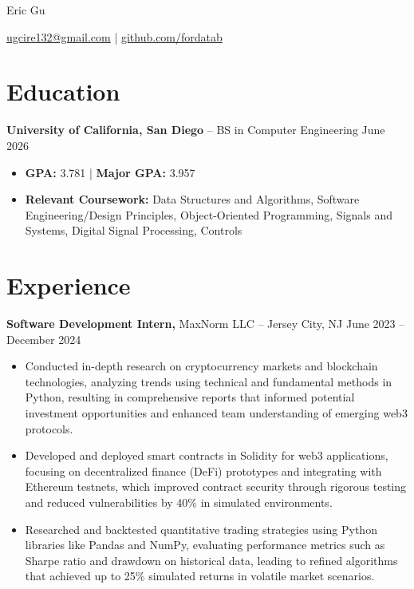 \documentclass[11pt]{article}       %
\begin{document}
\centerline{\Huge Eric Gu}

\vspace{-4pt}

\centerline{\href{mailto:ugcire132@gmail.com}{ugcire132@gmail.com} |  \href{github.com/fordatab}{github.com/fordatab}}

\vspace{-18.5pt}

\section*{Education}
\textbf{University of California, San Diego} -- BS in Computer Engineering  \hfill June 2026\begin{itemize}[leftmargin=*, nosep]
    \item \textbf{GPA:} 3.781 | \textbf{Major GPA:} 3.957
    \item \textbf{Relevant Coursework:} Data Structures and Algorithms, Software Engineering/Design Principles, Object-Oriented Programming, Signals and Systems, Digital Signal Processing, Controls
\end{itemize}


\vspace{-18.5pt}

\section*{Experience}
\textbf{Software Development Intern,} {MaxNorm LLC} -- Jersey City, NJ \hfill June 2023 -- December 2024 \
\vspace{-9pt}
\begin{itemize}
\item Conducted in-depth research on cryptocurrency markets and blockchain technologies, analyzing trends using technical and fundamental methods in Python, resulting in comprehensive reports that informed potential investment opportunities and enhanced team understanding of emerging web3 protocols.
\item Developed and deployed smart contracts in Solidity for web3 applications, focusing on decentralized finance (DeFi) prototypes and integrating with Ethereum testnets, which improved contract security through rigorous testing and reduced vulnerabilities by 40\% in simulated environments.
\item Researched and backtested quantitative trading strategies using Python libraries like Pandas and NumPy, evaluating performance metrics such as Sharpe ratio and drawdown on historical data, leading to refined algorithms that achieved up to 25\% simulated returns in volatile market scenarios.
\end{itemize}
\end{document}
